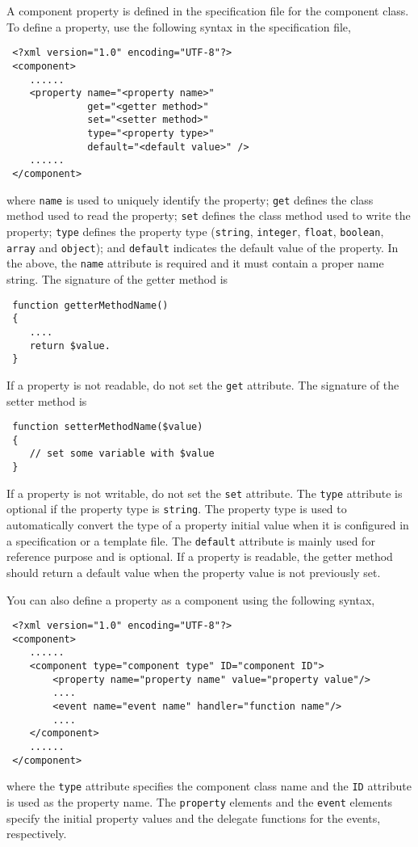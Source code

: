 \documentclass{book}
\begin{document}
A component property is defined in the specification file for the
component class. To define a property, use the following syntax in
the specification file,
\begin{verbatim}
 <?xml version="1.0" encoding="UTF-8"?>
 <component>
    ......
    <property name="<property name>"
              get="<getter method>"
              set="<setter method>"
              type="<property type>"
              default="<default value>" />
    ......
 </component>
\end{verbatim}
where \verb|name| is used to uniquely identify the property;
\verb|get| defines the class method used to read the property;
\verb|set| defines the class method used to write the property;
\verb|type| defines the property type (\verb|string|,
\verb|integer|, \verb|float|, \verb|boolean|, \verb|array| and
\verb|object|); and \verb|default| indicates the default value of
the property. In the above, the \verb|name| attribute is required
and it must contain a proper name string. The signature of the
getter method is
\begin{verbatim}
 function getterMethodName()
 {
    ....
    return $value.
 }
\end{verbatim}
If a property is not readable, do not set the \verb|get|
attribute. The signature of the setter method is
\begin{verbatim}
 function setterMethodName($value)
 {
    // set some variable with $value
 }
\end{verbatim}
If a property is not writable, do not set the \verb|set|
attribute. The \verb|type| attribute is optional if the property
type is \verb|string|. The property type is used to automatically
convert the type of a property initial value when it is configured
in a specification or a template file. The \verb|default|
attribute is mainly used for reference purpose and is optional. If
a property is readable, the getter method should return a default
value when the property value is not previously set.


You can also define a property as a component using the following
syntax,
\begin{verbatim}
 <?xml version="1.0" encoding="UTF-8"?>
 <component>
    ......
    <component type="component type" ID="component ID">
        <property name="property name" value="property value"/>
        ....
        <event name="event name" handler="function name"/>
        ....
    </component>
    ......
 </component>
\end{verbatim}
where the \verb|type| attribute specifies the component class name
and the \verb|ID| attribute is used as the property name. The
\verb|property| elements and the \verb|event| elements specify the
initial property values and the delegate functions for the events,
respectively.
\end{document}
